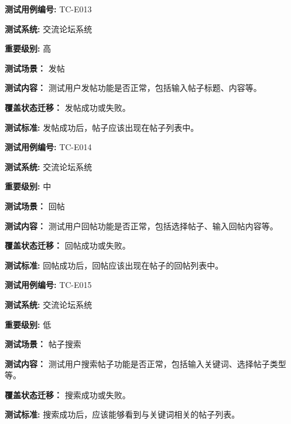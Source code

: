 \begin{framed} \textbf{测试用例编号:} TC-E013

\textbf{测试系统:} 交流论坛系统

\textbf{重要级别:} 高

\textbf{测试场景：} 发帖

\textbf{测试内容：} 测试用户发帖功能是否正常，包括输入帖子标题、内容等。

\textbf{覆盖状态迁移：} 发帖成功或失败。

\textbf{测试标准:} 发帖成功后，帖子应该出现在帖子列表中。

\begin{center}  \end{center} \end{framed}

\begin{framed} \textbf{测试用例编号:} TC-E014

\textbf{测试系统:} 交流论坛系统

\textbf{重要级别:} 中

\textbf{测试场景：} 回帖

\textbf{测试内容：} 测试用户回帖功能是否正常，包括选择帖子、输入回帖内容等。

\textbf{覆盖状态迁移：} 回帖成功或失败。

\textbf{测试标准:} 回帖成功后，回帖应该出现在帖子的回帖列表中。

\begin{center}  \end{center} \end{framed}

\begin{framed} \textbf{测试用例编号:} TC-E015

\textbf{测试系统:} 交流论坛系统

\textbf{重要级别:} 低

\textbf{测试场景：} 帖子搜索

\textbf{测试内容：} 测试用户搜索帖子功能是否正常，包括输入关键词、选择帖子类型等。

\textbf{覆盖状态迁移：} 搜索成功或失败。

\textbf{测试标准:} 搜索成功后，应该能够看到与关键词相关的帖子列表。

\begin{center}  \end{center} \end{framed}

